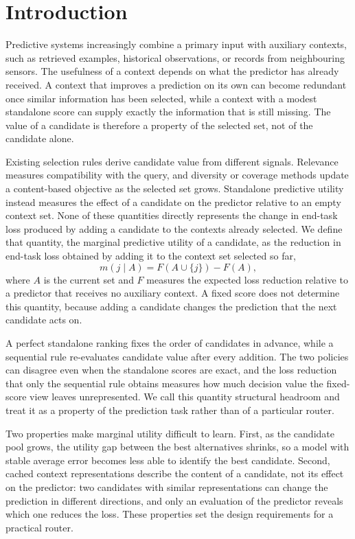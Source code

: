 \section{Introduction}

Predictive systems increasingly combine a primary input with auxiliary
contexts, such as retrieved examples, historical observations, or records from
neighbouring sensors. The usefulness of a context depends on what the
predictor has already received. A context that improves a prediction on its
own can become redundant once similar information has been selected, while a
context with a modest standalone score can supply exactly the information that
is still missing. The value of a candidate is therefore a property of the
selected set, not of the candidate alone.

Existing selection rules derive candidate value from different signals.
Relevance measures compatibility with the query, and diversity or coverage
methods update a content-based objective as the selected set grows. Standalone
predictive utility instead measures the effect of a candidate on the predictor
relative to an empty context set. None of these quantities directly represents
the change in end-task loss produced by adding a candidate to the contexts
already selected. We define that quantity, the marginal predictive utility of a
candidate, as the reduction in end-task loss obtained by adding it to the
context set selected so far,
\begin{equation}
 m(j\mid A)=F(A\cup\{j\})-F(A),
\end{equation}
where $A$ is the current set and $F$ measures the expected loss reduction
relative to a predictor that receives no auxiliary context. A fixed score does
not determine this quantity, because adding a candidate changes the prediction
that the next candidate acts on.

A perfect standalone ranking fixes the order of candidates in advance, while a
sequential rule re-evaluates candidate value after every addition. The two policies can disagree
even when the standalone scores are exact, and the loss reduction that only
the sequential rule obtains measures how much decision value the fixed-score
view leaves unrepresented. We call this quantity structural headroom and treat
it as a property of the prediction task rather than of a particular router.

Two properties make marginal utility difficult to learn. First, as the
candidate pool grows, the utility gap between the best alternatives shrinks,
so a model with stable average error becomes less able to identify the best
candidate. Second, cached context representations describe the content of a
candidate, not its effect on the predictor: two candidates with similar
representations can change the prediction in different directions, and only an
evaluation of the predictor reveals which one reduces the loss. These
properties set the design requirements for a practical router.

